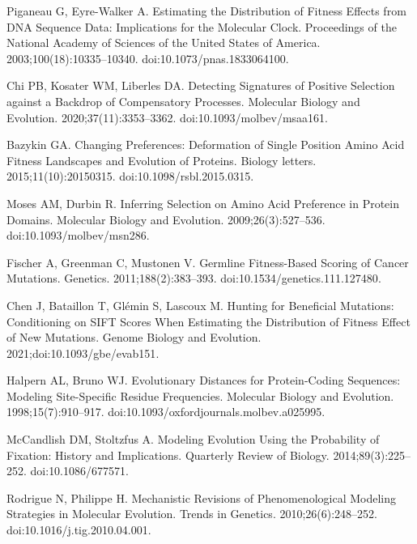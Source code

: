 \documentclass[10pt,letterpaper]{article}
\begin{document}
\begin{thebibliography}{10}
Piganeau G, {Eyre-Walker} A.
\newblock Estimating the Distribution of Fitness Effects from {{DNA}} Sequence
Data: {{Implications}} for the Molecular Clock.
\newblock Proceedings of the National Academy of Sciences of the United States
of America. 2003;100(18):10335--10340.
\newblock doi:{10.1073/pnas.1833064100}.

Chi PB, Kosater WM, Liberles DA.
\newblock Detecting {{Signatures}} of {{Positive Selection}} against a
{{Backdrop}} of {{Compensatory Processes}}.
\newblock Molecular Biology and Evolution. 2020;37(11):3353--3362.
\newblock doi:{10.1093/molbev/msaa161}.

Bazykin GA.
\newblock Changing Preferences: Deformation of Single Position Amino Acid
Fitness Landscapes and Evolution of Proteins.
\newblock Biology letters. 2015;11(10):20150315.
\newblock doi:{10.1098/rsbl.2015.0315}.

Moses AM, Durbin R.
\newblock Inferring {{Selection}} on {{Amino Acid Preference}} in {{Protein
Domains}}.
\newblock Molecular Biology and Evolution. 2009;26(3):527--536.
\newblock doi:{10.1093/molbev/msn286}.

Fischer A, Greenman C, Mustonen V.
\newblock Germline {{Fitness-Based Scoring}} of {{Cancer Mutations}}.
\newblock Genetics. 2011;188(2):383--393.
\newblock doi:{10.1534/genetics.111.127480}.

Chen J, Bataillon T, Gl{\'e}min S, Lascoux M.
\newblock Hunting for Beneficial Mutations: Conditioning on {{SIFT}} Scores
When Estimating the Distribution of Fitness Effect of New Mutations.
\newblock Genome Biology and Evolution. 2021;doi:{10.1093/gbe/evab151}.

Halpern AL, Bruno WJ.
\newblock Evolutionary Distances for Protein-Coding Sequences: Modeling
Site-Specific Residue Frequencies.
\newblock Molecular Biology and Evolution. 1998;15(7):910--917.
\newblock doi:{10.1093/oxfordjournals.molbev.a025995}.

McCandlish DM, Stoltzfus A.
\newblock Modeling Evolution Using the Probability of Fixation: {{History}} and
Implications.
\newblock Quarterly Review of Biology. 2014;89(3):225--252.
\newblock doi:{10.1086/677571}.

Rodrigue N, Philippe H.
\newblock Mechanistic Revisions of Phenomenological Modeling Strategies in
Molecular Evolution.
\newblock Trends in Genetics. 2010;26(6):248--252.
\newblock doi:{10.1016/j.tig.2010.04.001}.


\end{thebibliography}
\end{document}
